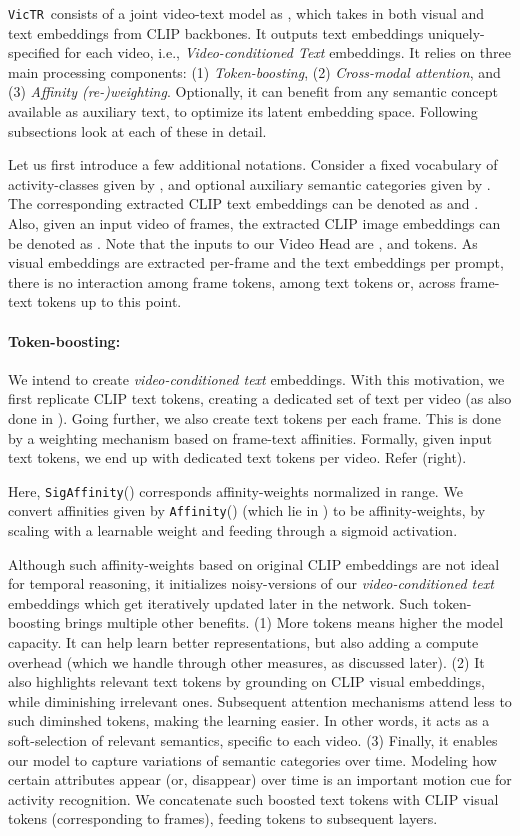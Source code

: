 \documentclass[10pt,twocolumn,letterpaper]{article}
\newcommand{\ours}{\texttt{VicTR}}
\begin{document}
\ours~consists of a joint video-text model as , which takes in both visual and text embeddings from CLIP backbones. It outputs text embeddings uniquely-specified for each video, i.e., \textit{Video-conditioned Text} embeddings. It relies on three main processing components: (1) \textit{Token-boosting}, (2) \textit{Cross-modal attention}, and (3) \textit{Affinity (re-)weighting}. Optionally, it can benefit from any semantic concept available as auxiliary text, to optimize its latent embedding space. Following subsections look at each of these in detail.

Let us first introduce a few additional notations. Consider a fixed vocabulary of  activity-classes given by , and optional  auxiliary semantic categories given by . The corresponding extracted CLIP text embeddings can be denoted as  and .
Also, given an input video  of  frames, the extracted CLIP image embeddings can be denoted as . Note that the inputs to our Video Head are ,  and  tokens. As visual embeddings are extracted per-frame and the text embeddings per prompt, there is no interaction among frame tokens, among text tokens or, across frame-text tokens up to this point.

\paragraph{Token-boosting:}
We intend to create \textit{video-conditioned text} embeddings. With this motivation, we first replicate CLIP \cite{radford2021clip} text tokens, creating a dedicated set of text per video (as also done in \cite{ma2022xclip}). Going further, we also create text tokens per each frame. This is done by a weighting mechanism based on frame-text affinities. Formally, given  input text tokens, we end up with  dedicated text tokens per video. Refer  (right).

Here, \texttt{SigAffinity}() corresponds affinity-weights normalized in  range. We convert affinities given by \texttt{Affinity}() (which lie in ) to be affinity-weights, by scaling with a learnable weight and feeding through a sigmoid activation.

Although such affinity-weights based on original CLIP embeddings are not ideal for temporal reasoning, it initializes noisy-versions of our \textit{video-conditioned text} embeddings which get iteratively updated later in the network. Such token-boosting brings multiple other benefits. (1) More tokens means higher the model capacity. It can help learn better representations, but also adding a compute overhead (which we handle through other measures, as discussed later). (2) It also highlights relevant text tokens by grounding on CLIP visual embeddings, while diminishing irrelevant ones. Subsequent attention mechanisms attend less to such diminshed tokens, making the learning easier. In other words, it acts as a soft-selection of relevant semantics, specific to each video. (3) Finally, it enables our model to capture variations of semantic categories over time. Modeling how certain attributes appear (or, disappear) over time is an important motion cue for activity recognition. We concatenate such boosted text tokens with CLIP visual tokens (corresponding to  frames), feeding  tokens to subsequent layers.
\end{document}
